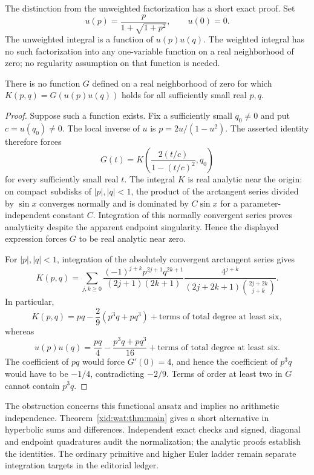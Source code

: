 The distinction from the unweighted factorization has a short exact proof. Set
\[
 u(p)=\frac{p}{1+\sqrt{1+p^2}},\qquad u(0)=0.
\]
The unweighted integral is a function of $u(p)u(q)$. The weighted
integral has no such factorization into any one-variable function on a
real neighborhood of zero; no regularity assumption on that function is needed.

\begin{proposition}\label{xid:wat:prop:nonfactor}
There is no function $G$ defined on a real neighborhood of zero for which
$K(p,q)=G(u(p)u(q))$ holds for all sufficiently small real $p,q$.
\end{proposition}

\begin{proof}
Suppose such a function exists. Fix a sufficiently small $q_0\ne0$ and
put $c=u(q_0)\ne0$. The local inverse of $u$ is
$p=2u/(1-u^2)$. The asserted identity therefore forces
\[
 G(t)=K\!\left(\frac{2(t/c)}{1-(t/c)^2},q_0\right)
\]
for every sufficiently small real $t$. The integral $K$ is real analytic
near the origin: on compact subdisks of $|p|,|q|<1$, the product of the
arctangent series divided by $\sin x$ converges normally and is dominated
by $C\sin x$ for a parameter-independent constant $C$. Integration of
this normally convergent series proves analyticity despite the apparent
endpoint singularity. Hence the displayed expression forces $G$ to
be real analytic near zero.

For $|p|,|q|<1$, integration of the absolutely convergent arctangent
series gives
\begin{equation}\label{xid:wat:eq:doubleTaylor}
 K(p,q)=\sum_{j,k\geq0}
 \frac{(-1)^{j+k}p^{2j+1}q^{2k+1}}{(2j+1)(2k+1)}
 \frac{4^{j+k}}{(2j+2k+1)\binom{2j+2k}{j+k}}.
\end{equation}
In particular,
\[
 K(p,q)=pq-\frac29(p^3q+pq^3)
       +\text{terms of total degree at least six},
\]
whereas
\[
 u(p)u(q)=\frac{pq}{4}-\frac{p^3q+pq^3}{16}
       +\text{terms of total degree at least six}.
\]
The coefficient of $pq$ would force $G'(0)=4$, and hence the
coefficient of $p^3q$ would have to be $-1/4$, contradicting $-2/9$.
Terms of order at least two in $G$ cannot contain $p^3q$.
\end{proof}

The obstruction concerns this functional ansatz and implies no arithmetic
independence. Theorem~\ref{xid:wat:thm:main} gives a short alternative in
hyperbolic sums and differences. Independent exact checks and signed,
diagonal and endpoint quadratures audit the normalization; the analytic
proofs establish the identities. The ordinary primitive and higher Euler
ladder remain separate integration targets in the editorial ledger.
